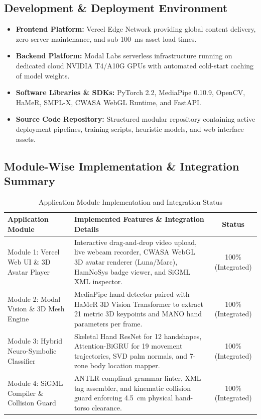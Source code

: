 \documentclass[11pt, a4paper]{article}
\begin{document}
\subsection{Development \& Deployment Environment}
\begin{itemize}[noitemsep, topsep=2pt]
    \item \textbf{Frontend Platform:} Vercel Edge Network providing global content delivery, zero server maintenance, and sub-100~ms asset load times.
    \item \textbf{Backend Platform:} Modal Labs serverless infrastructure running on dedicated cloud NVIDIA T4/A10G GPUs with automated cold-start caching of model weights.
    \item \textbf{Software Libraries \& SDKs:} PyTorch 2.2, MediaPipe 0.10.9, OpenCV, HaMeR, SMPL-X, CWASA WebGL Runtime, and FastAPI.
    \item \textbf{Source Code Repository:} Structured modular repository containing active deployment pipelines, training scripts, heuristic models, and web interface assets.
\end{itemize}

\subsection{Module-Wise Implementation \& Integration Summary}
\begin{table}[H]
    \centering
    \footnotesize
    \renewcommand{\arraystretch}{1.25}
    \begin{tabular}{|p{3.5cm}|p{7.8cm}|c|}
        \hline
        \textbf{Application Module} & \textbf{Implemented Features \& Integration Details} & \textbf{Status} \\
        \hline
        Module 1: Vercel Web UI \& 3D Avatar Player & Interactive drag-and-drop video upload, live webcam recorder, CWASA WebGL 3D avatar renderer (Luna/Marc), HamNoSys badge viewer, and SiGML XML inspector. & 100\% (Integrated) \\
        \hline
        Module 2: Modal Vision \& 3D Mesh Engine & MediaPipe hand detector paired with HaMeR 3D Vision Transformer to extract 21 metric 3D keypoints and MANO hand parameters per frame. & 100\% (Integrated) \\
        \hline
        Module 3: Hybrid Neuro-Symbolic Classifier & Skeletal Hand ResNet for 12 handshapes, Attention-BiGRU for 19 movement trajectories, SVD palm normals, and 7-zone body location mapper. & 100\% (Integrated) \\
        \hline
        Module 4: SiGML Compiler \& Collision Guard & ANTLR-compliant grammar linter, XML tag assembler, and kinematic collision guard enforcing 4.5~cm physical hand-torso clearance. & 100\% (Integrated) \\
        \hline
    \end{tabular}
    \caption{Application Module Implementation and Integration Status}
\end{table}
\end{document}

